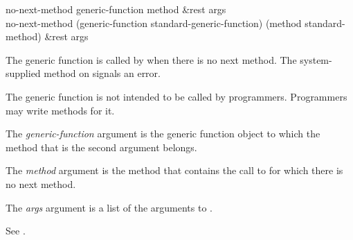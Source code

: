 \begin{defun}
no-next-method generic-function method &rest args \\
no-next-method (generic-function standard-generic-function)
    (method standard-method) &rest args

The generic function  is called by 
 when there is no next method.  The system-supplied
method on  signals an error.

The generic function  is not intended to be called
by programmers.  Programmers may write methods for it.

The \emph{generic-function} argument is the generic function object
to which the method that is the second argument belongs.

The \emph{method} argument is the method that contains the call to
 for which there is no next method.

The \emph{args} argument is a list of the arguments to
.

See .
\end{defun}


